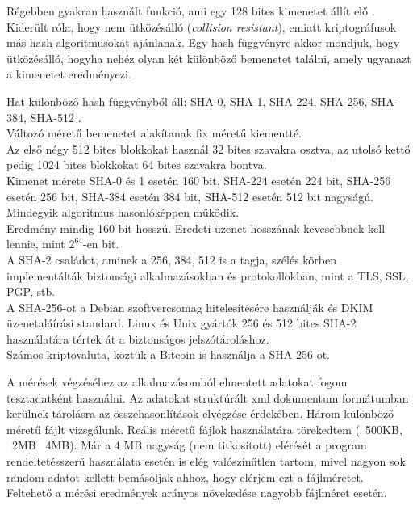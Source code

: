 Régebben gyakran használt funkció, ami egy 128 bites kimenetet állít elő \cite{gupta2014review}.
\vspace{5pt} \\Kiderült róla, hogy nem ütközésálló (\textit{collision resistant}), emiatt kriptográfusok más hash algoritmusokat ajánlanak. Egy hash függvényre akkor mondjuk, hogy ütközésálló, hogyha nehéz olyan két különböző bemenetet találni, amely ugyanazt a kimenetet eredményezi.



Hat különböző hash függvényből áll: SHA-0, SHA-1, SHA-224, SHA-256, SHA-384, SHA-512 \cite{dang2008recommendation}.
\vspace{5pt} \\Változó méretű bemenetet alakítanak fix méretű kiementté.
\vspace{5pt} \\Az első négy 512 bites blokkokat használ 32 bites szavakra osztva, az utolsó kettő pedig 1024 bites blokkokat 64 bites szavakra bontva.
\vspace{5pt} \\Kimenet mérete SHA-0 és 1 esetén 160 bit, SHA-224 esetén 224 bit, SHA-256 esetén 256 bit, SHA-384 esetén 384 bit, SHA-512 esetén 512 bit nagyságú.
\vspace{5pt} \\Mindegyik algoritmus hasonlóképpen működik.
\vspace{5pt} \\Eredmény mindig 160 bit hosszú. Eredeti üzenet hosszának kevesebbnek kell lennie, mint $2^{64}$-en bit.
\vspace{5pt} \\A SHA-2 családot, aminek a 256, 384, 512 is a tagja, szélés körben implementálták biztonsági alkalmazásokban és protokollokban, mint a TLS, SSL, PGP, stb.
\vspace{5pt} \\A SHA-256-ot a Debian szoftvercsomag hitelesítésére használják és DKIM üzenetaláírási standard. Linux és Unix gyártók 256 és 512 bites SHA-2 használatára tértek át a biztonságos jelszótároláshoz.
\vspace{5pt} \\Számos kriptovaluta, köztük a Bitcoin is használja a SHA-256-ot.


\vspace{25pt}

A mérések végzéséhez az alkalmazásomból elmentett adatokat fogom tesztadatként használni. Az adatokat struktúrált xml dokumentum formátumban kerülnek tárolásra az összehasonlítások elvégzése érdekében. Három különböző méretű fájlt vizsgálunk. Reális méretű fájlok használatára törekedtem (~500KB, ~2MB ~4MB). Már a 4 MB nagyság (nem titkosított) elérését a program rendeltetésszerű használata esetén is elég valószínűtlen tartom, mivel nagyon sok random adatot kellett bemásoljak ahhoz, hogy elérjem ezt a fájlméretet. 
\vspace{5pt}\\Feltehető a mérési eredmények arányos növekedése nagyobb fájlméret esetén.

